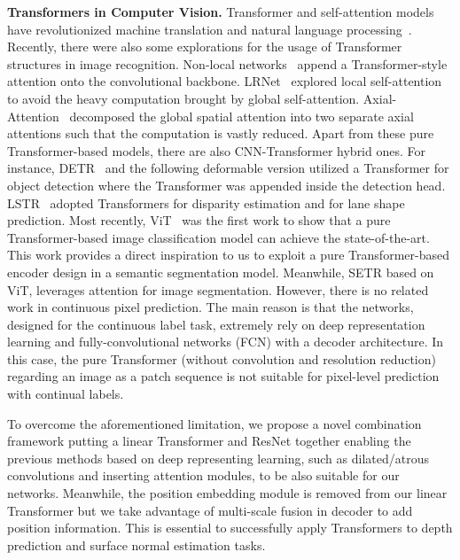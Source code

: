 \documentclass[10pt,twocolumn,letterpaper]{article}
\begin{document}
\noindent\textbf{Transformers in Computer Vision.}
Transformer and self-attention models have revolutionized machine translation and natural language processing~\cite{vaswani2017attention,dai2019transformer}.
Recently, there were also some explorations for the usage of Transformer structures in image recognition. Non-local networks~\cite{wang2018non} append a Transformer-style attention onto the convolutional backbone. 
LRNet~\cite{hu2019local} explored local self-attention to avoid the heavy computation brought by global self-attention. 
Axial-Attention~\cite{wang2020axial} decomposed the global spatial attention into two separate axial attentions such that the computation is vastly reduced. Apart from these pure Transformer-based models, there are also CNN-Transformer hybrid ones.
For instance, DETR~\cite{carion2020end} and the following deformable version utilized a Transformer for object detection where the Transformer was appended inside the detection head. 
LSTR~\cite{liu2021end} adopted Transformers for disparity estimation and for lane shape prediction. 
Most recently, ViT~\cite{dosovitskiy2020image} was the first work to show that a pure Transformer-based image classification model can achieve the state-of-the-art. This work provides a direct inspiration to us to exploit a pure Transformer-based encoder design in a semantic segmentation model. Meanwhile, SETR  \cite{zheng2020rethinking} based on ViT, leverages attention for image segmentation. However, there is no related work in continuous pixel prediction. The main reason is that the networks, designed for the continuous label task, extremely rely on deep representation learning and fully-convolutional networks (FCN) with a decoder architecture.
In this case, the pure Transformer (without convolution and resolution reduction) regarding an image as a patch sequence is not suitable for pixel-level prediction with continual labels.


To overcome the aforementioned limitation, we propose a novel combination framework putting a linear Transformer and ResNet together enabling the previous methods based on deep representing learning, such as dilated/atrous convolutions and inserting attention modules, to be also suitable for our networks. Meanwhile, the position embedding module is removed from our linear Transformer but we take advantage of multi-scale fusion in decoder to add position information.  This is essential to successfully apply Transformers to depth prediction and surface normal estimation tasks.
\end{document}
